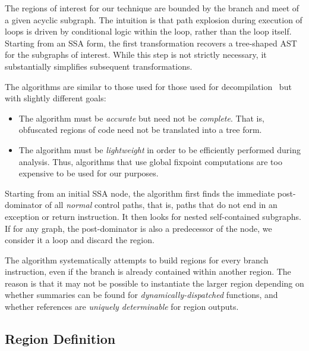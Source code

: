 The regions of interest for our technique are bounded by the branch and meet of a given acyclic subgraph.  The intuition is that path explosion during execution of loops is driven by conditional logic within the loop, rather than the loop itself.
Starting from an SSA form, the first transformation recovers a tree-shaped AST for the subgraphs of interest.  While this step is not strictly necessary, it substantially simplifies subsequent transformations.  

The algorithms are similar to those used for those used for decompilation~\cite{Yakdan15@decompilation} but with slightly different goals: 
\begin{itemize}
    \item The algorithm must be {\em accurate} but need not be {\em complete}.  That is, obfuscated regions of code need not be translated into a tree form.
    \item The algorithm must be {\em lightweight} in order to be efficiently performed during analysis.  Thus, algorithms that use global fixpoint computations are 
        too expensive to be used for our purposes.
\end{itemize}

Starting from an initial SSA node, the algorithm first finds the immediate post-dominator of all {\em normal} control paths, that is, paths that do not end in an exception or return instruction.  It then looks for nested self-contained subgraphs.  If for any graph, the post-dominator is also a predecessor of the node, we consider it a loop and discard the region.  

The algorithm systematically attempts to build regions for every branch instruction, even if the branch is already contained within another region.  The reason is that it may not be possible to instantiate the larger region depending on whether summaries can be found for {\em dynamically-dispatched} functions, and whether references are {\em uniquely determinable} for region outputs.

\subsection{Region Definition}

